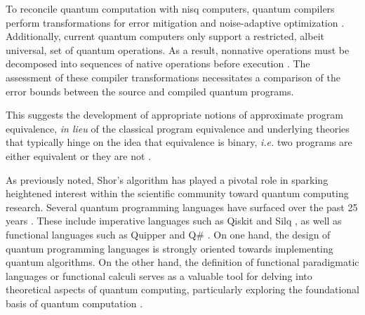 To reconcile quantum computation with \acrshort{nisq} computers, quantum compilers perform transformations for error mitigation \cite{wallman2016noise} and noise-adaptive optimization \cite{murali2019noise}. Additionally, current quantum computers only support a restricted, albeit universal, set of quantum operations. As a result, nonnative operations must be decomposed into sequences of native operations before execution \cite{harrow2002efficient,burgholzer2020advanced}. The assessment of these compiler transformations necessitates a comparison of the error bounds between the source and compiled quantum programs. 

This suggests the development of appropriate notions of approximate program equivalence, \textit {in lieu} of the classical program equivalence and underlying theories that typically hinge on the idea that equivalence is binary, \textit{i.e.} two programs are either equivalent or they are not \cite{winskel1993formal}.


As previously noted, Shor's algorithm has played a pivotal role in sparking heightened interest within the scientific community toward quantum computing research. Several quantum programming languages have surfaced over the past 25 years \cite{zhao2020quantum,serrano2022quantum}. These include imperative languages such as Qiskit \cite{Qiskit} and Silq \cite{bichsel2020silq}, as well as functional languages such as Quipper \cite{green2013quipper} and Q\# \cite{svore2018q}. On one hand, the design of quantum programming languages is strongly oriented towards implementing quantum algorithms. On the other hand, the  definition of functional paradigmatic languages or functional calculi serves as a valuable tool for delving into theoretical aspects of quantum computing, particularly exploring the foundational basis of quantum computation \cite{zorzi2016quantum}. 


